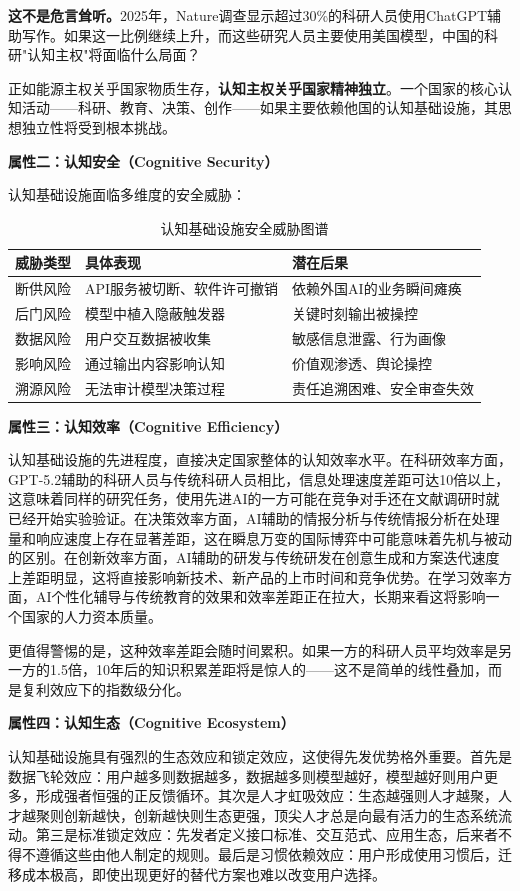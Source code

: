 \textbf{这不是危言耸听。}2025年，Nature调查显示超过30\%的科研人员使用ChatGPT辅助写作。如果这一比例继续上升，而这些研究人员主要使用美国模型，中国的科研"认知主权"将面临什么局面？

正如能源主权关乎国家物质生存，\textbf{认知主权关乎国家精神独立}。一个国家的核心认知活动——科研、教育、决策、创作——如果主要依赖他国的认知基础设施，其思想独立性将受到根本挑战。

\textbf{属性二：认知安全（Cognitive Security）}

认知基础设施面临多维度的安全威胁：

\begin{table}[H]
\centering
\caption{认知基础设施安全威胁图谱}
\small
\begin{tabular}{p{2.5cm}p{4cm}p{5cm}}
\toprule
\textbf{威胁类型} & \textbf{具体表现} & \textbf{潜在后果} \\
\midrule
断供风险 & API服务被切断、软件许可撤销 & 依赖外国AI的业务瞬间瘫痪 \\
后门风险 & 模型中植入隐蔽触发器 & 关键时刻输出被操控 \\
数据风险 & 用户交互数据被收集 & 敏感信息泄露、行为画像 \\
影响风险 & 通过输出内容影响认知 & 价值观渗透、舆论操控 \\
溯源风险 & 无法审计模型决策过程 & 责任追溯困难、安全审查失效 \\
\bottomrule
\end{tabular}
\end{table}

\textbf{属性三：认知效率（Cognitive Efficiency）}

认知基础设施的先进程度，直接决定国家整体的认知效率水平。在科研效率方面，GPT-5.2辅助的科研人员与传统科研人员相比，信息处理速度差距可达10倍以上，这意味着同样的研究任务，使用先进AI的一方可能在竞争对手还在文献调研时就已经开始实验验证。在决策效率方面，AI辅助的情报分析与传统情报分析在处理量和响应速度上存在显著差距，这在瞬息万变的国际博弈中可能意味着先机与被动的区别。在创新效率方面，AI辅助的研发与传统研发在创意生成和方案迭代速度上差距明显，这将直接影响新技术、新产品的上市时间和竞争优势。在学习效率方面，AI个性化辅导与传统教育的效果和效率差距正在拉大，长期来看这将影响一个国家的人力资本质量。

更值得警惕的是，这种效率差距会随时间累积。如果一方的科研人员平均效率是另一方的1.5倍，10年后的知识积累差距将是惊人的——这不是简单的线性叠加，而是复利效应下的指数级分化。

\textbf{属性四：认知生态（Cognitive Ecosystem）}

认知基础设施具有强烈的生态效应和锁定效应，这使得先发优势格外重要。首先是数据飞轮效应：用户越多则数据越多，数据越多则模型越好，模型越好则用户更多，形成强者恒强的正反馈循环。其次是人才虹吸效应：生态越强则人才越聚，人才越聚则创新越快，创新越快则生态更强，顶尖人才总是向最有活力的生态系统流动。第三是标准锁定效应：先发者定义接口标准、交互范式、应用生态，后来者不得不遵循这些由他人制定的规则。最后是习惯依赖效应：用户形成使用习惯后，迁移成本极高，即使出现更好的替代方案也难以改变用户选择。

